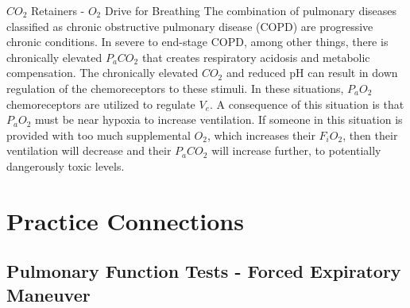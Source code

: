 \begin{warning}{$CO_2$ Retainers - $O_2$ Drive for Breathing}
    The combination of pulmonary diseases classified as chronic obstructive pulmonary disease (COPD) are progressive chronic conditions. In severe to end-stage COPD, among other things, there is chronically elevated $P_aCO_2$ that creates respiratory acidosis and metabolic compensation. The chronically elevated $CO_2$ and reduced pH can result in down regulation of the chemoreceptors to these stimuli. In these situations, $P_aO_2$ chemoreceptors are utilized to regulate $V_e$. A consequence of this situation is that $P_aO_2$ must be near hypoxia to increase ventilation. If someone in this situation is provided with too much supplemental $O_2$, which increases their $F_iO_2$, then their ventilation will decrease and their $P_aCO_2$ will increase further, to potentially dangerously toxic levels.
\end{warning}

\section{Practice Connections}

\subsection{Pulmonary Function Tests - Forced Expiratory Maneuver}


